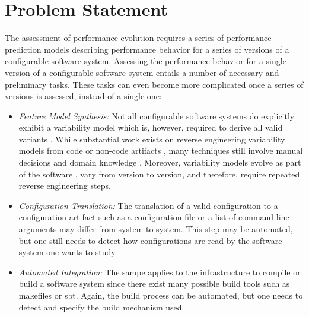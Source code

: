 \section{Problem Statement}
The assessment of performance evolution requires a series of
performance-prediction models describing performance behavior for a series of
versions of a configurable software system. Assessing the performance behavior
for a single version of a configurable software system entails a number of
necessary and preliminary tasks. These tasks can even become more complicated
once a series of versions is assessed, instead of a single one:
\begin{itemize}
  \item \emph{Feature Model Synthesis:} Not all configurable software systems do
  explicitly exhibit a variability model which is, however, required to derive
  all valid variants \citep{rabkin_static_2011,nadi_where_2015}.
	While substantial work exists on reverse engineering variability models from
	code
	\citep{rabkin_static_2011,she_reverse_2011,zhou_extracting_2015,nadi_where_2015}
	 or non-code artifacts
	\citep{alves_exploratory_2008,andersen_efficient_2012,bakar_feature_2015}, many
	techniques still involve manual decisions \citep{she_reverse_2011} and domain
	knowledge \citep{nadi_where_2015}.
	Moreover, variability models evolve as part of the software
	\citep{peng_analyzing_2011}, vary from version to version, and therefore,
	require repeated reverse engineering steps.
	
	\item \emph{Configuration Translation:} The translation of a valid
	configuration to a configuration artifact such as a configuration file or a list of command-line arguments may differ
from system to system. This step may be automated, but one still needs to
detect how configurations are read by the software system one wants to study.

\item \emph{Automated Integration:} The sampe applies to the
infrastructure to compile or build a software system since there exist many
possible build tools such as makefiles or sbt.
Again, the build process can be automated, but one needs to detect and
specify the build mechanism used.


\end{itemize}
